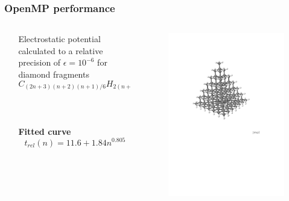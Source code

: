 \documentclass[mathserif, 8pt]{beamer}
\begin{document}
\begin{frame}
    \frametitle{OpenMP performance}
    \begin{columns}
    \begin{column}{.10\textwidth}
    \ \\
    \end{column}
    \begin{column}{.45\textwidth}
    \centering
    Electrostatic potential calculated to a relative precision of $\epsilon=10^{-6}$
    for diamond fragments
    \begin{equation}
	\nonumber
	C_{(2n+3)(n+2)(n+1)/6}H_{2(n+2)(n+1)}
    \end{equation}
    \ \\
    \ \\
    \ \\
    \textbf{Fitted curve}
    \begin{equation}
	\nonumber
	t_{rel}(n) = 11.6 + 1.84n^{0.805}
    \end{equation}
    \end{column}
    \begin{column}{.50\textwidth}
	\begin{figure}
	    \includegraphics[scale=0.25, clip, viewport = 10 390 500 720]{figures/diamond.pdf}

\end{figure}
\end{column}
\end{columns}
\end{frame}
\end{document}
